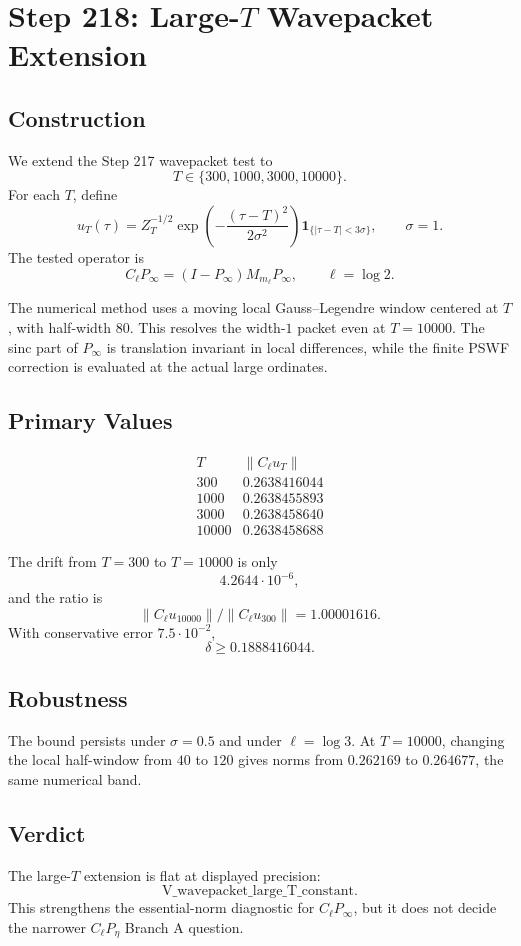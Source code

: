 \documentclass[11pt]{article}
\begin{document}
\section*{Step 218: Large-\(T\) Wavepacket Extension}

\subsection*{Construction}

We extend the Step 217 wavepacket test to
\[
T\in\{300,1000,3000,10000\}.
\]
For each \(T\), define
\[
u_T(\tau)=Z_T^{-1/2}\exp\!\left(-\frac{(\tau-T)^2}{2\sigma^2}\right)
\mathbf 1_{\{|\tau-T|<3\sigma\}},
\qquad \sigma=1.
\]
The tested operator is
\[
C_\ell P_\infty=(I-P_\infty)M_{m_\ell}P_\infty,\qquad \ell=\log 2.
\]

The numerical method uses a moving local Gauss--Legendre window centered at \(T\), with half-width \(80\).  This resolves the width-\(1\) packet even at \(T=10000\).  The sinc part of \(P_\infty\) is translation invariant in local differences, while the finite PSWF correction is evaluated at the actual large ordinates.

\subsection*{Primary Values}

\[
\begin{array}{c|c}
T & \|C_\ell u_T\|\\
\hline
300 & 0.2638416044\\
1000 & 0.2638455893\\
3000 & 0.2638458640\\
10000 & 0.2638458688
\end{array}
\]

The drift from \(T=300\) to \(T=10000\) is only
\[
4.2644\cdot 10^{-6},
\]
and the ratio is
\[
\|C_\ell u_{10000}\|/\|C_\ell u_{300}\|=1.00001616.
\]
With conservative error \(7.5\cdot 10^{-2}\),
\[
\delta\ge 0.1888416044.
\]

\subsection*{Robustness}

The bound persists under \(\sigma=0.5\) and under \(\ell=\log 3\).  At \(T=10000\), changing the local half-window from \(40\) to \(120\) gives norms from \(0.262169\) to \(0.264677\), the same numerical band.

\subsection*{Verdict}

The large-\(T\) extension is flat at displayed precision:
\[
\boxed{\mathrm{V\_wavepacket\_large\_T\_constant}}.
\]
This strengthens the essential-norm diagnostic for \(C_\ell P_\infty\), but it does not decide the narrower \(C_\ell P_\eta\) Branch A question.
\end{document}
